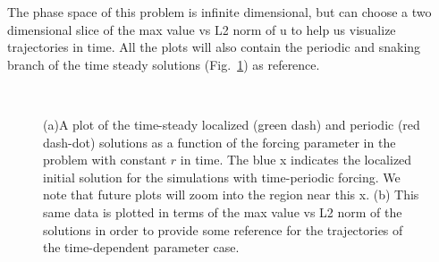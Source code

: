 \documentclass[pre,preprint,superscriptaddress]{revtex4-1}
\begin{document}
The phase space of this problem is infinite dimensional, but can choose a two dimensional slice of the max value vs L2 norm of u to help us visualize trajectories in time.  All the plots will also contain the periodic and snaking branch of the time steady solutions (Fig.~\ref{fig:NormMaxBack}) as reference.  

\begin{figure}[h!]
  \begin{center}
    \mbox{
       \quad
      }
    \caption{(a)A plot of the time-steady localized (green dash) and periodic (red dash-dot) solutions as a function of the forcing parameter in the problem with constant $r$ in time.  The blue x indicates the localized initial solution for the simulations with time-periodic forcing.  We note that future plots will zoom into the region near this x.  (b) This same data is plotted in terms of the max value vs L2 norm of the solutions in order to provide some reference for the trajectories of the time-dependent parameter case. }
    \label{fig:NormMaxBack}
  \end{center}
\end{figure} 
\end{document}
